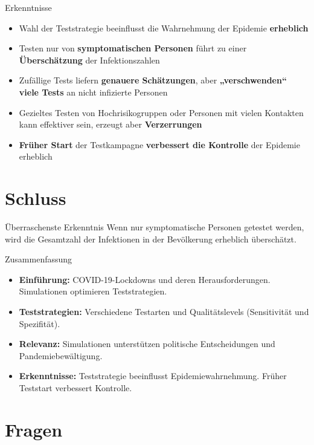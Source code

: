 \documentclass[ngerman,14pt,aspectratio=1610]{beamer}
\def\secname{Gliederung} %
\let\oldsection\section
\renewcommand{\section}[1]{
	\oldsection{#1}
	\newtotcounter{#1}
	\def\secname{#1}
}
\newcommand{\source}{}
\begin{document}
	\begin{frame}[t]{Erkenntnisse}
		\begin{itemize}
			\item Wahl der Teststrategie beeinflusst die Wahrnehmung der Epidemie \textbf{erheblich}
			\item Testen nur von \textbf{symptomatischen Personen} führt zu einer \textbf{Überschätzung} der Infektionszahlen
			\item Zufällige Tests liefern \textbf{genauere Schätzungen}, aber \textbf{„verschwenden“ viele Tests} an nicht infizierte Personen
			\item Gezieltes Testen von Hochrisikogruppen oder Personen mit vielen Kontakten kann effektiver sein, erzeugt aber \textbf{Verzerrungen}
			\item \textbf{Früher Start} der Testkampagne \textbf{verbessert die Kontrolle} der Epidemie erheblich
		\end{itemize}
	\end{frame}
	
	\section{Schluss}
		\renewcommand{\source}{ }
	
		\begin{frame}[t]{Überraschenste Erkenntnis} \vspace{80pt}
			 Wenn nur symptomatische Personen getestet werden, wird die Gesamtzahl der Infektionen in der Bevölkerung erheblich überschätzt.
		\end{frame}
		
		\begin{frame}[t]{Zusammenfassung}
			\begin{itemize}
				\item \textbf{Einführung:} COVID-19-Lockdowns und deren Herausforderungen. Simulationen optimieren Teststrategien.
				\item \textbf{Teststrategien:} Verschiedene Testarten und Qualitätslevels (Sensitivität und Spezifität).
				\item \textbf{Relevanz:} Simulationen unterstützen politische Entscheidungen und Pandemiebewältigung.
				\item \textbf{Erkenntnisse:} Teststrategie beeinflusst Epidemiewahrnehmung. Früher Teststart verbessert Kontrolle.
			\end{itemize}
		\end{frame}
	
	\section{Fragen}
	
\end{document}
